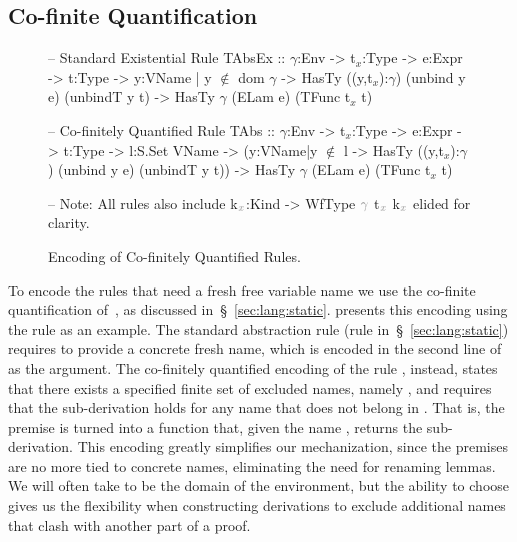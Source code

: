 \begin{fullversion}
  \subsection{Co-finite Quantification}
  \label{subsec:implementation:co-finite}
  \begin{figure}[t!]
  \begin{mcode}
-- Standard Existential Rule
TAbsEx :: $\gamma$:Env -> t$_x$:Type -> e:Expr -> t:Type
       -> y:{VName | y $\not\in$ dom $\gamma$ }
       -> HasTy ((y,t$_x$):$\gamma$) (unbind y e) (unbindT y t)
       -> HasTy $\gamma$ (ELam e) (TFunc t$_x$ t)

-- Co-finitely Quantified Rule
TAbs  :: $\gamma$:Env -> t$_x$:Type -> e:Expr -> t:Type -> l:S.Set VName
      -> (y:{VName|y $\not\in$ l} -> HasTy ((y,t$_x$):$\gamma$) (unbind y e) (unbindT y t))
      -> HasTy $\gamma$ (ELam e) (TFunc t$_x$ t)

-- Note: All rules also include k$_{\color{gray_ulisses}x}$:Kind -> WfType ${\color{gray_ulisses}\gamma}$ t$_{\color{gray_ulisses}x}$ k$_{\color{gray_ulisses}x}$ elided for clarity.
  \end{mcode}
  \caption{Encoding of Co-finitely Quantified Rules.}
  \label{fig:impl:co-finite}
  \end{figure}


  To encode the rules that need a fresh free variable name
  we use the co-finite quantification of~\citet{AydemirCPPW08}, as discussed
  in~\S~\ref{sec:lang:static}.
   presents
  this encoding using the \tAbs rule
  as an example.
  The standard abstraction rule
  (rule \tAbsEx in~\S~\ref{sec:lang:static})
  requires to provide a concrete fresh name,
  which is encoded in the second line of
   as the  argument.
  The co-finitely quantified encoding of the rule , instead,
  states that there exists a specified finite set of excluded names, namely ,
  and requires that the sub-derivation holds for any name 
  that does not belong in .
  That is, the premise is turned into a function
  that, given the name , returns the sub-derivation.
  This encoding greatly simplifies our mechanization,
  since the premises are no more tied to concrete names,
  eliminating the need for renaming lemmas.
  We will often take  to be the domain
  of the environment, but the ability to choose 
  gives us the flexibility when constructing derivations
  to exclude additional names that clash
  with another part of a proof.
\end{fullversion}
